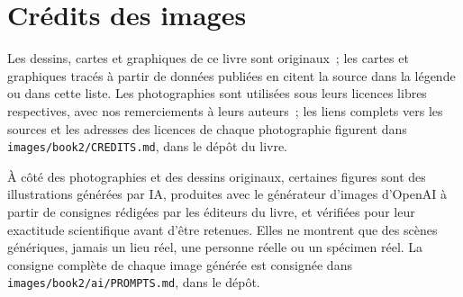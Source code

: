 \chapter*{Crédits des images}

Les dessins, cartes et graphiques de ce livre sont originaux~; les cartes
et graphiques tracés à partir de données publiées en citent la source dans
la légende ou dans cette liste. Les photographies sont utilisées sous leurs
licences libres respectives, avec nos remerciements à leurs auteurs~; les
liens complets vers les sources et les adresses des licences de chaque
photographie figurent dans \texttt{images/book2/CREDITS.md}, dans le dépôt
du livre.

\bigskip
À côté des photographies et des dessins originaux, certaines figures sont
des illustrations générées par IA, produites avec le générateur d'images
d'OpenAI à partir de consignes rédigées par les éditeurs du livre, et
vérifiées pour leur exactitude scientifique avant d'être retenues. Elles
ne montrent que des scènes génériques, jamais un lieu réel, une personne
réelle ou un spécimen réel. La consigne complète de chaque image générée
est consignée dans \texttt{images/book2/ai/PROMPTS.md}, dans le dépôt.

